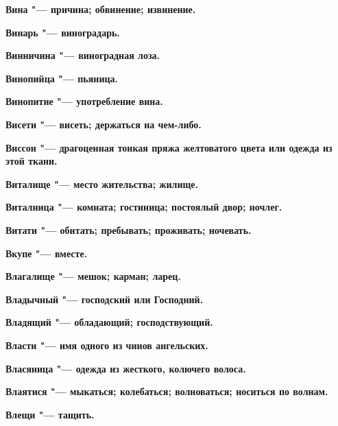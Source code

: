 \bfseries Вина \normalfont{} "--- причина; обвинение; извинение. 




\bfseries Винарь \normalfont{} "--- виноградарь. 




\bfseries Винничина \normalfont{} "--- виноградная лоза. 




\bfseries Винопийца \normalfont{} "--- пьяница. 




\bfseries Винопитие \normalfont{} "--- употребление вина. 




\bfseries Висети \normalfont{} "--- висеть; держаться на чем-либо. 




\bfseries Виссон \normalfont{} "--- драгоценная тонкая пряжа желтоватого цвета или одежда из этой ткани. 




\bfseries Виталище \normalfont{} "--- место жительства; жилище. 




\bfseries Виталница \normalfont{} "--- комната; гостиница; постоялый двор; ночлег. 




\bfseries Витати \normalfont{} "--- обитать; пребывать; проживать; ночевать. 




\bfseries Вкупе \normalfont{} "--- вместе. 




\bfseries Влагалище \normalfont{} "--- мешок; карман; ларец. 




\bfseries Владычный \normalfont{} "--- господский или Господний. 




\bfseries Владящий \normalfont{} "--- обладающий; господствующий. 




\bfseries Власти \normalfont{} "--- имя одного из чинов ангельских. 




\bfseries Власяница \normalfont{} "--- одежда из жесткого, колючего волоса. 




\bfseries Влаятися \normalfont{} "--- мыкаться; колебаться; волноваться; носиться по волнам. 




\bfseries Влещи \normalfont{} "--- тащить. 




